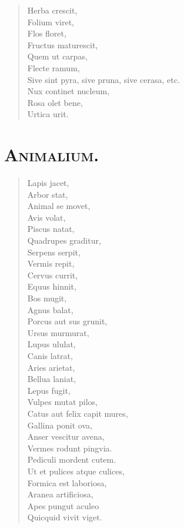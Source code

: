 \begin{verse}

  Herba crescit,\\
  Folium viret,\\
  Flos floret,\\
  Fructus maturescit,\\
  Quem ut carpas,\\
  Flecte ramum,\\
  Sive sint pyra, sive pruna, sive cerasa, etc.\\
  Nux continet nucleum,\\
  Rosa olet bene,\\
  Urtica urit.\\
\end{verse}

\section*{\textsc{Animalium.}}


\begin{verse}

  Lapis jacet,\\
  Arbor stat,\\
  Animal se movet,\\
  Avis volat,\\
  Piscus natat,\\
  Quadrupes graditur,\\
  Serpens serpit,\\
  Vermis repit,\\
  Cervus currit,\\
  Equus hinnit,\\
  Bos mugit,\\
  Agnus balat,\\
  Porcus aut sus grunit,\\
  Ursus murmurat,\\
  Lupus ululat,\\
  Canis latrat,\\
  Aries arietat,\\
  Bellua laniat,\\
  Lepus fugit,\\
  Vulpes mutat pilos,\\
  Catus aut felix capit mures,\\
  Gallina ponit ova,\\
  Anser vescitur avena,\\
  Vermes rodunt pingvia.\\
  Pediculi mordent cutem.\\
  Ut et pulices atque culices,\\
  Formica est laboriosa,\\
  Aranea artificiosa,\\
  Apes pungut aculeo \\
  Quicquid vivit viget.\\
\end{verse}

